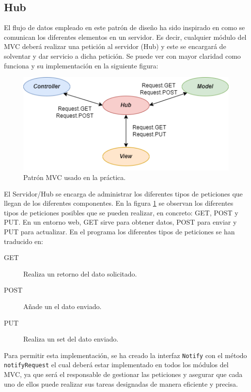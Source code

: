 \subsection{Hub}

El flujo de datos empleado en este patrón de diseño ha sido inspirado en como se comunican los diferentes elementos en un servidor. Es decir, cualquier módulo del MVC deberá realizar una petición al servidor (Hub) y este se encargará de solventar y dar servicio a dicha petición. Se puede ver con mayor claridad como funciona y su implementación en la siguiente figura:\bigskip

\begin{figure}[!h]
    \centering
    \includegraphics[width=\linewidth]{MVC/img/flujocom.png}
    \caption{Patrón MVC usado en la práctica.}
    \label{fig:flujo_datos}
\end{figure}

El Servidor/Hub se encarga de administrar los diferentes tipos de peticiones que llegan de los diferentes componentes. En la figura \ref{fig:flujo_datos} se observan los diferentes tipos de peticiones posibles que se pueden realizar, en concreto: GET, POST y PUT. En un entorno web, GET sirve para obtener datos, POST para enviar y PUT para actualizar. En el programa los diferentes tipos de peticiones se han traducido en: \medskip

\begin{description}
    \item[GET  ] Realiza un retorno del dato solicitado.
    \item[POST] Añade un el dato enviado.
    \item[PUT  ] Realiza un set del dato enviado.
\end{description}\medskip

Para permitir esta implementación, se ha creado la interfaz \texttt{Notify} con el método \texttt{notifyRequest} el cual deberá estar implementado en todos los módulos del MVC, ya que será el responsable de gestionar las peticiones y asegurar que cada uno de ellos puede realizar sus tareas designadas de manera eficiente y precisa.
